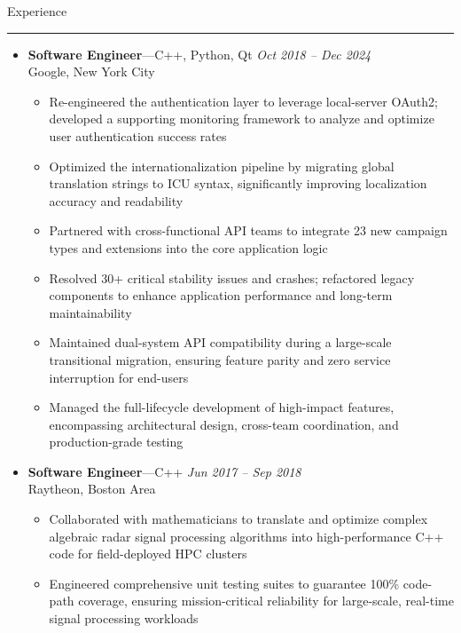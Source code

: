 \documentclass[10pt,oneside]{article}
\newcommand{\sectitle}[1]{
  \begin{flushleft}{\selectfont\Large#1}\end{flushleft}
}
\newenvironment{ressection}[1]{
  \vspace{0pt}
  \sectitle{#1}
  \vspace{-10pt}\rule{\textwidth}{0.5pt}
  \vspace{-10pt}
  \begin{itemize}[leftmargin=0pt, rightmargin=-5pt, label={}]
  \vspace{-2pt}
  }{
  \end{itemize}
}
\newcommand{\ressubitem}[1]{
  \vspace{-1pt}
  \item[$\bullet$] \begin{flushleft} #1 \end{flushleft}
}
\newcommand{\resbigitemline}[4]{
  \vspace{-1pt}
  \item
  \textbf{#1}---#4
  \hfill
  \textit{#3} \\
  #2

}
\newenvironment{ressubsecline}[4]{
  \resbigitemline{#1}{#2}{#3}{#4}
  \vspace{-2pt}
  \begin{itemize}[rightmargin=5pt]
}{
  \end{itemize}
  \vspace{-2pt}
}
\begin{document}
\begin{ressection}{Experience}
\begin{ressubsecline}{Software Engineer}{Google, New York City}{Oct 2018 -- Dec 2024}{C++, Python, Qt}
    \ressubitem{Re-engineered the authentication layer to leverage local-server OAuth2; developed a supporting monitoring framework to analyze and optimize user authentication success rates}
    \ressubitem{Optimized the internationalization pipeline by migrating global translation strings to ICU syntax, significantly improving localization accuracy and readability}
    \ressubitem{Partnered with cross-functional API teams to integrate 23 new campaign types and extensions into the core application logic}
    \ressubitem{Resolved 30+ critical stability issues and crashes; refactored legacy components to enhance application performance and long-term maintainability}
    \ressubitem{Maintained dual-system API compatibility during a large-scale transitional migration, ensuring feature parity and zero service interruption for end-users}
    \ressubitem{Managed the full-lifecycle development of high-impact features, encompassing architectural design, cross-team coordination, and production-grade testing}
  \end{ressubsecline}
  \begin{ressubsecline}{Software Engineer}{Raytheon, Boston Area}{Jun 2017 -- Sep 2018}{C++}
    \ressubitem{Collaborated with mathematicians to translate and optimize complex algebraic radar signal processing algorithms into high-performance C++ code for field-deployed HPC clusters}
    \ressubitem{Engineered comprehensive unit testing suites to guarantee 100\% code-path coverage, ensuring mission-critical reliability for large-scale, real-time signal processing workloads}
  \end{ressubsecline}
\end{ressection}

\newpage
\end{document}
